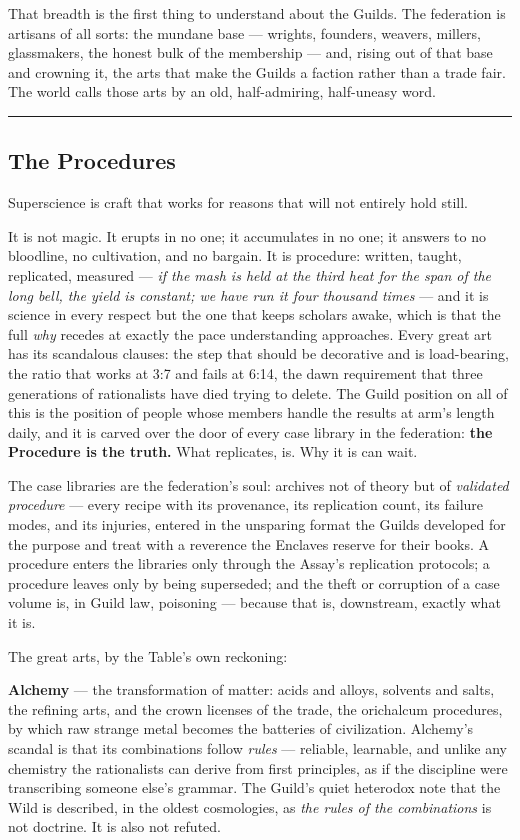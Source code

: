 That breadth is the first thing to understand about the Guilds. The federation is artisans of all sorts: the mundane base --- wrights, founders, weavers, millers, glassmakers, the honest bulk of the membership --- and, rising out of that base and crowning it, the arts that make the Guilds a faction rather than a trade fair. The world calls those arts by an old, half-admiring, half-uneasy word.

\medskip\hrule\medskip

\subsection{The Procedures}

Superscience is craft that works for reasons that will not entirely hold still.

It is not magic. It erupts in no one; it accumulates in no one; it answers to no bloodline, no cultivation, and no bargain. It is procedure: written, taught, replicated, measured --- \textit{if the mash is held at the third heat for the span of the long bell, the yield is constant; we have run it four thousand times} --- and it is science in every respect but the one that keeps scholars awake, which is that the full \textit{why} recedes at exactly the pace understanding approaches. Every great art has its scandalous clauses: the step that should be decorative and is load-bearing, the ratio that works at 3:7 and fails at 6:14, the dawn requirement that three generations of rationalists have died trying to delete. The Guild position on all of this is the position of people whose members handle the results at arm's length daily, and it is carved over the door of every case library in the federation: \textbf{the Procedure is the truth.} What replicates, is. Why it is can wait.

The case libraries are the federation's soul: archives not of theory but of \textit{validated procedure} --- every recipe with its provenance, its replication count, its failure modes, and its injuries, entered in the unsparing format the Guilds developed for the purpose and treat with a reverence the Enclaves reserve for their books. A procedure enters the libraries only through the Assay's replication protocols; a procedure leaves only by being superseded; and the theft or corruption of a case volume is, in Guild law, poisoning --- because that is, downstream, exactly what it is.

The great arts, by the Table's own reckoning:

\textbf{Alchemy} --- the transformation of matter: acids and alloys, solvents and salts, the refining arts, and the crown licenses of the trade, the orichalcum procedures, by which raw strange metal becomes the batteries of civilization. Alchemy's scandal is that its combinations follow \textit{rules} --- reliable, learnable, and unlike any chemistry the rationalists can derive from first principles, as if the discipline were transcribing someone else's grammar. The Guild's quiet heterodox note that the Wild is described, in the oldest cosmologies, as \textit{the rules of the combinations} is not doctrine. It is also not refuted.

